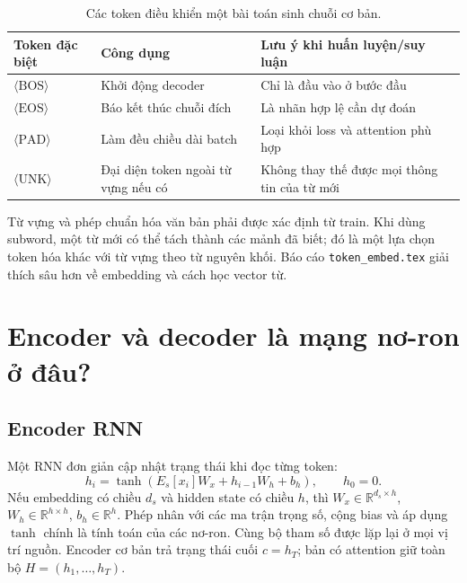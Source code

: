 \documentclass[11pt,a4paper]{article}
\begin{document}
\begin{table}[ht]
\centering\small
\begin{tabular}{p{3cm}p{4.6cm}p{5.1cm}}\toprule
Token đặc biệt & Công dụng & Lưu ý khi huấn luyện/suy luận\\\midrule
$\langle\mathrm{BOS}\rangle$ & Khởi động decoder & Chỉ là đầu vào ở bước đầu\\
$\langle\mathrm{EOS}\rangle$ & Báo kết thúc chuỗi đích & Là nhãn hợp lệ cần dự đoán\\
$\langle\mathrm{PAD}\rangle$ & Làm đều chiều dài batch & Loại khỏi loss và attention phù hợp\\
$\langle\mathrm{UNK}\rangle$ & Đại diện token ngoài từ vựng nếu có & Không thay thế được mọi thông tin của từ mới\\\bottomrule
\end{tabular}
\caption{Các token điều khiển một bài toán sinh chuỗi cơ bản.}
\end{table}
Từ vựng và phép chuẩn hóa văn bản phải được xác định từ train. Khi dùng subword, một từ mới có thể tách thành các mảnh đã biết; đó là một lựa chọn token hóa khác với từ vựng theo từ nguyên khối. Báo cáo \texttt{token\_embed.tex} giải thích sâu hơn về embedding và cách học vector từ.

\section{Encoder và decoder là mạng nơ-ron ở đâu?}
\subsection{Encoder RNN}
Một RNN đơn giản cập nhật trạng thái khi đọc từng token:
\begin{equation}
h_i=\tanh\!\left(E_s[x_i]W_x+h_{i-1}W_h+b_h\right),\qquad h_0=0.
\end{equation}
Nếu embedding có chiều $d_s$ và hidden state có chiều $h$, thì $W_x\in\mathbb R^{d_s\times h}$, $W_h\in\mathbb R^{h\times h}$, $b_h\in\mathbb R^h$. Phép nhân với các ma trận trọng số, cộng bias và áp dụng $\tanh$ chính là tính toán của các nơ-ron. Cùng bộ tham số được lặp lại ở mọi vị trí nguồn. Encoder cơ bản trả trạng thái cuối $c=h_T$; bản có attention giữ toàn bộ $H=(h_1,\ldots,h_T)$.
\end{document}
